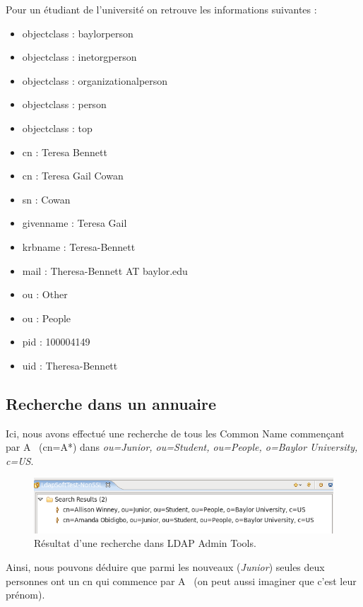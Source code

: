 \documentclass[12pt,a4paper,notitlepage]{article}
\begin{document}
Pour un étudiant de l'université on retrouve les informations suivantes :
\begin{itemize}
\item objectclass : baylorperson
\item objectclass : inetorgperson
\item objectclass : organizationalperson
\item objectclass : person
\item objectclass : top
\item cn : Teresa Bennett
\item cn : Teresa Gail Cowan
\item sn : Cowan
\item givenname : Teresa Gail
\item krbname : Teresa-Bennett
\item mail : Theresa-Bennett AT baylor.edu
\item ou : Other
\item ou : People
\item pid : 100004149
\item uid : Theresa-Bennett
\end{itemize}
  
\subsection{Recherche dans un annuaire}
Ici, nous avons effectué une recherche de tous les Common Name commençant par \og A \fg\ (cn=A*) dans \textit{ou=Junior, ou=Student, ou=People, o=Baylor University, c=US}.

\begin{figure}[!h]
\begin{center}
\includegraphics[scale=0.61]{recherche}
\caption{Résultat d'une recherche dans LDAP Admin Tools.}
\label{fig:da}
\end{center}
\end{figure}

Ainsi, nous pouvons déduire que parmi les nouveaux (\textit{Junior}) seules deux personnes ont un cn qui commence par \og A \fg\ (on peut aussi imaginer que c'est leur prénom).
\end{document}
